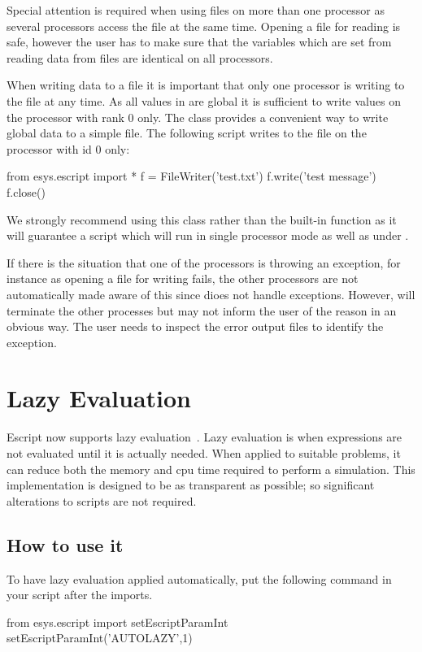 Special attention is required when using files on more than one processor as 
several processors access the file at the same time. Opening a file for
reading is safe, however the user has to make sure that the variables which are 
set from reading data from files are identical on all processors.

When writing data to a file it is important that only one processor is writing to
the file at any time. As all values in \escript are global it is sufficient
to write values on the processor with \MPI rank $0$ only. 
The  class provides a convenient way to write global data
to a simple file.  The following script writes to the file 
 on the processor with id $0$ only:
\begin{python}
from esys.escript import *
f = FileWriter('test.txt')
f.write('test message')
f.close()
\end{python}
We strongly recommend using this class rather than the built-in 
function as it will guarantee a script which will run in single processor mode as well as under \MPI.

If there is the situation that one of the processors is throwing an exception, 
for instance as opening a file for writing fails, the other processors 
are not automatically made aware of this since \MPI
dioes not handle exceptions.
However, \MPI will terminate the other processes but 
may not inform the user of the reason in an obvious way. The user needs to inspect the
error output files to identify the exception.

\section{Lazy Evaluation}
\label{sec:lazy}
Escript now supports lazy evaluation~\cite{lazyauspdc}.
Lazy evaluation is when expressions are not evaluated until it is actually needed.
When applied to suitable problems, it can reduce both the memory and cpu time required to
perform a simulation.
This implementation is designed to be as transparent as possible; so significant 
alterations to scripts are not required.

\subsection*{How to use it}
To have lazy evaluation applied automatically, put the following command in your script
after the imports.

\begin{python}
from esys.escript import setEscriptParamInt
setEscriptParamInt('AUTOLAZY',1)
\end{python}

